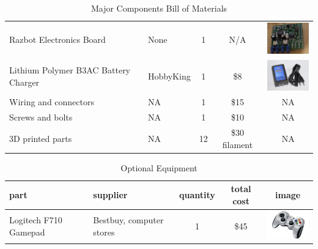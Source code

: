 \documentclass[12pt,titlepage,oneside]{memoir}
\begin{document}
\begin{table}[!h]
\begin{tabular}{p{4cm} | p{3.5cm} | c | c | c}
Razbot Electronics Board & None & 1 & N/A &  \includegraphics[width=80px]{picture/piboard.jpg}\\
Lithium Polymer B3AC Battery Charger & HobbyKing & 1 & \$8 & \includegraphics[width=80px]{picture/charger.jpg}\\
Wiring and connectors & NA & 1 & \$15 & NA \\
Screws and bolts & NA &1 & \$10 & NA \\
3D printed parts & NA & 12 & \$30 filament & NA \\
\end{tabular}
\caption{Major Components Bill of Materials}
\label{table:BOM}
\end{table}

\begin{table}[!h]
\begin{tabular}{p{4cm} | p{3.5cm} | c | c | c}
part & supplier &  quantity &   total cost & image\\
\hline
Logitech F710 Gamepad & Bestbuy, computer stores & 1  & \$45 & \includegraphics[width=80px]{picture/f710.png}\\
\end{tabular}
\caption{Optional Equipment}
\label{table:opBOM}
\end{table}
\end{document}
